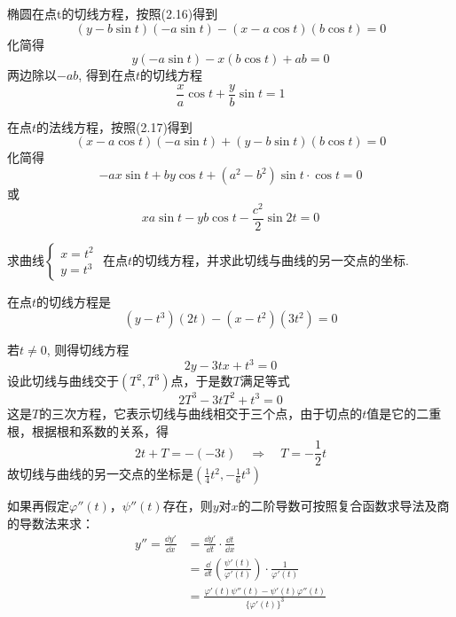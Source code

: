 \begin{solution}
椭圆在点t的切线方程，按照(2.16)得到
\[(y-b\sin t) (-a\sin t )-(x-a\cos t)(b\cos t)=0\]
    化简得
 \[   y ( - a\sin t) - x(b\cos t)+ab=0\]
    两边除以$-ab$, 得到在点$t$的切线方程
\[\frac{x}{a}\cos t+\frac{y}{b}\sin t=1\]

在点$t$的法线方程，按照(2.17)得到
\[(x-a\cos t) (-a\sin t)+(y-b\sin t)(b\cos t)=0\]
    化简得
\[   -ax\sin t+by\cos t+ (a^2-b^2) \sin t\cdot \cos t=0\]
    或
    \[xa\sin t-yb\cos t-\frac{c^2}{2}\sin 2t=0\]
\end{solution}    

\begin{example}
    求曲线$\begin{cases}
        x=t^2\\y=t^3
    \end{cases}$
    在点$t$的切线方程，并求此切线与曲线的另一交点的坐标.
\end{example}

\begin{solution}
在点$t$的切线方程是
\[(y-t^3)(2t)-(x-t^2)(3t^2)=0\]

若$t\ne 0$, 则得切线方程
  \[  2y-3tx+t^3=0\]
    设此切线与曲线交于$(T^2,T^3)$点，于是数$T$满足等式
   \[ 2T^3-3tT^2+t^3=0\]
    这是$T$的三次方程，它表示切线与曲线相交于三个点，由于切点的$t$值是它的二重根，根据根和系数的关系，得
\[2t+T=-(-3t)\quad \Rightarrow\quad T=-\frac{1}{2}t\]
故切线与曲线的另一交点的坐标是$\left(\frac{1}{4}t^2,-\frac{1}{6}t^3\right)$

如果再假定$\varphi''(t)$，$\psi''(t)$存在，则$y$对$x$的二阶导数可按照复合函数求导法及商的导数法来求：
\begin{align*}
    y''=\frac{\dd y'}{\dd x}&=\frac{\dd y'}{\dd t}\cdot \frac{\dd t}{\dd x}\\
    &=\frac{\dd }{\dd t}\left(\frac{\psi'(t)}{\varphi'(t)}\right)\cdot \frac{1}{\varphi'(t)}\\
    &=\frac{\varphi'(t)\psi''(t)-\psi'(t)\varphi''(t)}{\big\{\varphi'(t)\big\}^3}
\end{align*}
\end{solution}

